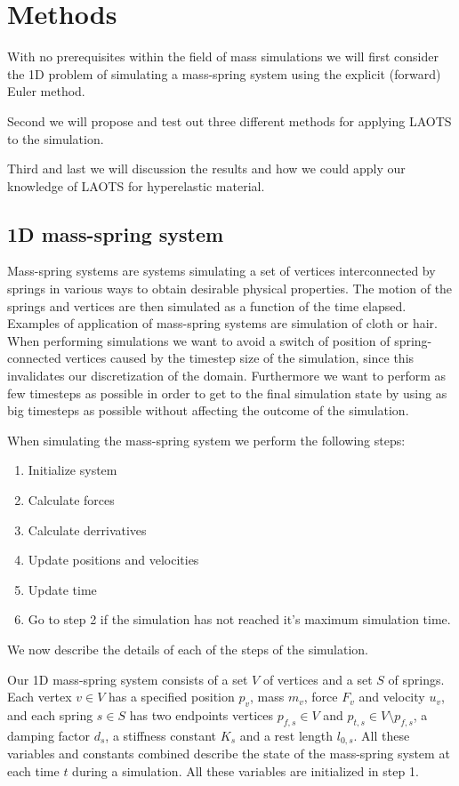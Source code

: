 \documentclass[11pt]{article}
\begin{document}

\section{Methods}
\label{sec:methods}

With no prerequisites within the field of mass simulations we will first
consider the 1D problem of simulating a mass-spring system using the explicit
(forward) Euler method.

Second we will propose and test out three different methods for applying LAOTS
to the simulation.

Third and last we will discussion the results and how we could apply our
knowledge of LAOTS for hyperelastic material.

\subsection{1D mass-spring system} Mass-spring systems are systems simulating
a set of vertices interconnected by springs in various ways to obtain
desirable physical properties. The motion of the springs and vertices are
then simulated as a function of the time elapsed. Examples of application of
mass-spring systems are simulation of cloth or hair. When performing simulations
we want to avoid a switch of position of spring-connected vertices caused by the
timestep size of the simulation, since this invalidates our discretization of
the domain. Furthermore we want to perform as few timesteps as possible in order
to get to the final simulation state by using as big timesteps as possible
without affecting the outcome of the simulation.

When simulating the mass-spring system we perform the following steps:
\begin{enumerate} \item Initialize system \item Calculate forces \item
Calculate derrivatives \item Update positions and velocities \item Update time
\item Go to step 2 if the simulation has not reached it's maximum simulation
time. \end{enumerate} We now describe the details of each of the steps of
the simulation.

Our 1D mass-spring system consists of a set $V$ of vertices and a set
$S$ of springs. Each vertex $v \in V$ has a specified position $p_v$,
mass $m_v$, force $F_v$ and velocity $u_v$, and each spring $s \in S$
has two endpoints vertices $p_{f,s} \in V$ and $p_{t,s} \in V \setminus
p_{f,s}$, a damping factor $d_s$, a stiffness constant $K_s$ and a rest length
$l_{0,s}$. All these variables and constants combined describe the state
of the mass-spring system at each time $t$ during a simulation. All these
variables are initialized in step 1.
\end{document}
